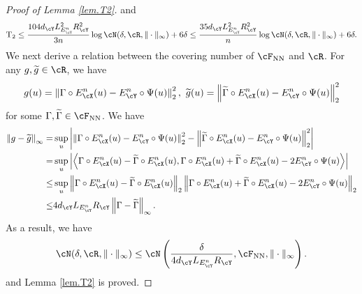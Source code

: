 \documentclass[11pt]{article} %
\begin{document}
\begin{proof}[Proof of Lemma \ref{lem.T2}]
	and 
	$$
	{\rm T_2}\leq \frac{104d_{\cY}L_{E^n_{\cY}}^2R_{\cY}^2}{3n}\log \cN(\delta,\cR,\|\cdot\|_{\infty})+6\delta\leq \frac{35d_{\cY}L_{E^n_{\cY}}^2R_{\cY}^2}{n}\log \cN(\delta,\cR,\|\cdot\|_{\infty})+6\delta.
	$$
	We next derive a relation between the covering number of $\cF_{\rm NN}$ and $\cR$. For any $g,\widetilde{g}\in \cR$, we have
	$$
	g(u)=\left\|\Gamma \circ E_{\cX}^n(u)- E_{\cY}^n\circ\Psi(u)\right\|^2_2, \ \widetilde{g}(u)=\left\|\widetilde{\Gamma} \circ E_{\cX}^n(u)- E_{\cY}^n\circ\Psi(u)\right\|^2_2
	$$
	for some $\Gamma,\widetilde{\Gamma}\in \cF_{\rm NN}$. We have
	\begin{align*}
		\left\|g-\widetilde{g}\right\|_{\infty}=&\sup_u \left|\left\|\Gamma \circ E_{\cX}^n(u)- E_{\cY}^n\circ\Psi(u)\right\|^2_2-\left\|\widetilde{\Gamma} \circ E_{\cX}^n(u)-  E_{\cY}^n\circ\Psi(u)\right\|^2_2\right| \nonumber\\
		=&\sup_u \left|\left\langle \Gamma \circ E_{\cX}^n(u)-\widetilde{\Gamma} \circ E_{\cX}^n(u), \Gamma \circ E_{\cX}^n(u)+\widetilde{\Gamma} \circ E_{\cX}^n(u)-2E_{\cY}^n\circ\Psi(u)\right\rangle\right| \nonumber\\
		\leq & \sup_u \left\| \Gamma \circ E_{\cX}^n(u)-\widetilde{\Gamma} \circ E_{\cX}^n(u)\right\|_2 \left\| \Gamma \circ E_{\cX}^n(u)+\widetilde{\Gamma} \circ E_{\cX}^n(u)-2E_{\cY}^n\circ\Psi(u)\right\|_2 \nonumber\\
		\leq& 4d_{\cY}L_{E^n_{\cY}}R_{\cY}\left\| \Gamma -\widetilde{\Gamma} \right\|_{\infty}.
	\end{align*}
	As a result, we have
	$$
	\cN(\delta,\cR,\|\cdot\|_{\infty})\leq \cN\left(\frac{\delta}{4d_{\cY}L_{E^n_{\cY}}R_{\cY}},\cF_{\rm NN},\|\cdot\|_{\infty}\right).
	$$
	and Lemma \ref{lem.T2} is proved.
\end{proof}
\end{document}
